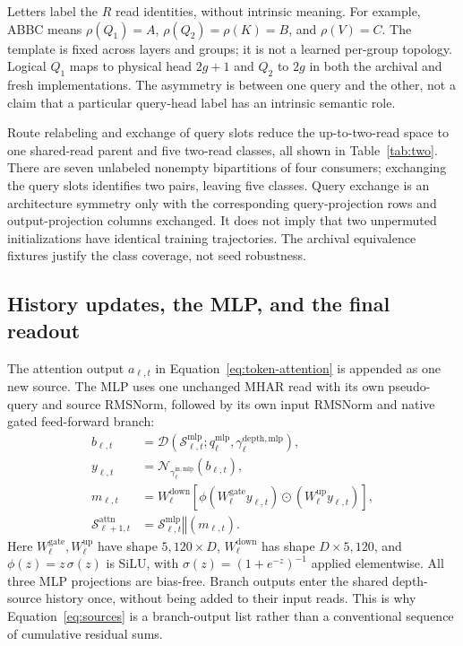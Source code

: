 \documentclass[11pt,letterpaper]{article}
\newcommand{\route}[1]{\textsf{#1}}
\begin{document}
Letters label the $R$ read identities, without intrinsic meaning.
For example, \route{ABBC} means $\rho(Q_1)=A$, $\rho(Q_2)=\rho(K)=B$, and $\rho(V)=C$.
The template is fixed across layers and groups; it is not a learned per-group
topology. Logical $Q_1$ maps to physical head $2g+1$ and $Q_2$ to $2g$ in both
the archival and fresh implementations.
The asymmetry is between one query and the other, not a claim that a particular
query-head label has an intrinsic semantic role.

Route relabeling and exchange of query slots reduce the up-to-two-read space to
one shared-read parent and five two-read classes, all shown in
Table~\ref{tab:two}. There are seven unlabeled nonempty bipartitions of four
consumers; exchanging the query slots identifies two pairs, leaving five
classes. Query exchange is an
architecture symmetry only with the corresponding query-projection rows and
output-projection columns exchanged. It does not imply that two unpermuted
initializations have identical training trajectories. The archival equivalence
fixtures justify the class coverage, not seed robustness.

\subsection{History updates, the MLP, and the final readout}
The attention output $a_{\ell,t}$ in Equation~\ref{eq:token-attention} is
appended as one new source. The MLP uses one unchanged MHAR read with its own
pseudo-query and source RMSNorm, followed by its own input RMSNorm and native
gated feed-forward branch:
\begin{align}
 b_{\ell,t}
   &=\mathcal{D}(\mathcal{S}^{\mathrm{mlp}}_{\ell,t};
        q^{\mathrm{mlp}}_\ell,\gamma^{\mathrm{depth,mlp}}_\ell),\\
 y_{\ell,t}&=\mathcal{N}_{\gamma^{\mathrm{in,mlp}}_\ell}(b_{\ell,t}),\\
 m_{\ell,t}&=W^{\mathrm{down}}_\ell
       \left[\phi(W^{\mathrm{gate}}_\ell y_{\ell,t})
       \odot(W^{\mathrm{up}}_\ell y_{\ell,t})\right],\\
 \mathcal{S}^{\mathrm{attn}}_{\ell+1,t}
   &=\mathcal{S}^{\mathrm{mlp}}_{\ell,t}\mathbin{\Vert}(m_{\ell,t}).
 \label{eq:branch-updates}
\end{align}
Here $W^{\mathrm{gate}}_\ell,W^{\mathrm{up}}_\ell$ have shape
$5,120\times D$, $W^{\mathrm{down}}_\ell$ has shape $D\times5,120$, and
$\phi(z)=z\,\sigma(z)$ is SiLU, with $\sigma(z)=(1+e^{-z})^{-1}$ applied
elementwise. All three MLP projections are bias-free. Branch outputs enter
the shared depth-source history once, without being added to their input reads.
This is why Equation~\ref{eq:sources} is a branch-output list rather than a
conventional sequence of cumulative residual sums.
\end{document}
